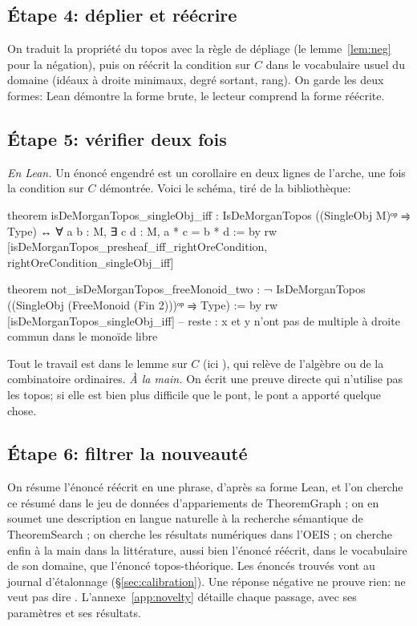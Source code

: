 \subsection{Étape 4: déplier et réécrire}

On traduit la propriété du topos avec la règle de dépliage (le lemme~\ref{lem:neg} pour la négation), puis on réécrit la condition sur $C$ dans le vocabulaire usuel du domaine (idéaux à droite minimaux, degré sortant, rang). On garde les deux formes: Lean démontre la forme brute, le lecteur comprend la forme réécrite.

\subsection{Étape 5: vérifier deux fois}

\emph{En Lean.} Un énoncé engendré est un corollaire en deux lignes de l'arche, une fois la condition sur $C$ démontrée. Voici le schéma, tiré de la bibliothèque:
\begin{leancode}
theorem isDeMorganTopos_singleObj_iff :
    IsDeMorganTopos ((SingleObj M)ᵒᵖ ⥤ Type) ↔ ∀ a b : M, ∃ c d : M, a * c = b * d := by
  rw [isDeMorganTopos_presheaf_iff_rightOreCondition, rightOreCondition_singleObj_iff]

theorem not_isDeMorganTopos_freeMonoid_two :
    ¬ IsDeMorganTopos ((SingleObj (FreeMonoid (Fin 2)))ᵒᵖ ⥤ Type) := by
  rw [isDeMorganTopos_singleObj_iff]
  -- reste : x et y n'ont pas de multiple à droite commun dans le monoïde libre
\end{leancode}
Tout le travail est dans le lemme sur $C$ (ici ), qui relève de l'algèbre ou de la combinatoire ordinaires. \emph{À la main.} On écrit une preuve directe qui n'utilise pas les topos; si elle est bien plus difficile que le pont, le pont a apporté quelque chose.

\subsection{Étape 6: filtrer la nouveauté}

On résume l'énoncé réécrit en une phrase, d'après sa forme Lean, et l'on cherche ce résumé dans le jeu de données d'appariements de TheoremGraph \cite{theoremgraph-matching}; on en soumet une description en langue naturelle à la recherche sémantique de TheoremSearch \cite{theoremsearch}; on cherche les résultats numériques dans l'OEIS \cite{oeis}; on cherche enfin à la main dans la littérature, aussi bien l'énoncé réécrit, dans le vocabulaire de son domaine, que l'énoncé topos-théorique. Les énoncés trouvés vont au journal d'étalonnage (\S\ref{sec:calibration}). Une réponse négative ne prouve rien:  ne veut pas dire . L'annexe~\ref{app:novelty} détaille chaque passage, avec ses paramètres et ses résultats.

